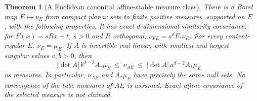 \documentclass[11pt]{article}
\newtheorem{theorem}{Theorem}[section]
\theoremstyle{definition}\newtheorem{definition}[theorem]{Definition}
\theoremstyle{remark}\newtheorem{remark}[theorem]{Remark}
\begin{document}
\begin{theorem}[A Euclidean canonical affine-stable measure class]
\label{thm:intrinsic-tube-measure}
There is a Borel map $E\mapsto\nu_E$ from compact planar sets to finite
positive measures, supported on $E$, with the following properties.
It has exact $d$-dimensional similarity covariance: for
$F(x)=sRx+t$, $s>0$ and $R$ orthogonal,
$\nu_{FE}=s^d F_*\nu_E$.
For every content-regular $E$, $\nu_E=\mu_E$. If $A$ is invertible
real-linear, with smallest and largest singular values $a,b>0$, then
\[
 |\det A|\,b^{d-2} A_*\mu_E
       \ \le\ \nu_{AE}\ \le\
 |\det A|\,a^{d-2} A_*\mu_E
 \tag{IM2}
\]
as measures. In particular, $\nu_{AE}$ and $A_*\mu_E$ have precisely
the same null sets. No convergence of the tube measures of $AE$ is
assumed. Exact affine covariance of the selected measure is not claimed.
\end{theorem}
\end{document}
